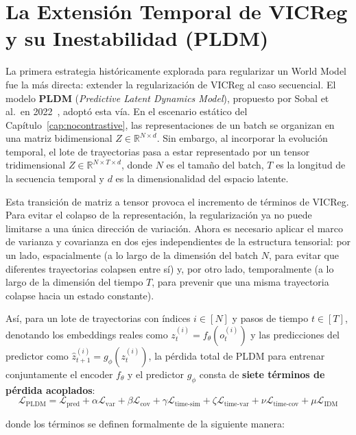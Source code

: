 \section{La Extensión Temporal de VICReg y su Inestabilidad (PLDM)}
\label{sec:vicreg_temporal_pldm}

La primera estrategia históricamente explorada para regularizar un World Model fue la más directa: extender la regularización de VICReg al caso secuencial. El modelo \textbf{PLDM} (\textit{Predictive Latent Dynamics Model}), propuesto por Sobal et al.\ en 2022~\cite{sobal2022joint}, adoptó esta vía. En el escenario estático del Capítulo~\ref{cap:nocontrastive}, las representaciones de un batch se organizan en una matriz bidimensional $Z \in \mathbb{R}^{N \times d}$. Sin embargo, al incorporar la evolución temporal, el lote de trayectorias pasa a estar representado por un tensor tridimensional $Z \in \mathbb{R}^{N \times T \times d}$, donde $N$ es el tamaño del batch, $T$ es la longitud de la secuencia temporal y $d$ es la dimensionalidad del espacio latente.

Esta transición de matriz a tensor provoca el incremento de términos de VICReg. Para evitar el colapso de la representación, la regularización ya no puede limitarse a una única dirección de variación. Ahora es necesario aplicar el marco de varianza y covarianza en dos ejes independientes de la estructura tensorial: por un lado, espacialmente (a lo largo de la dimensión del batch $N$, para evitar que diferentes trayectorias colapsen entre sí) y, por otro lado, temporalmente (a lo largo de la dimensión del tiempo $T$, para prevenir que una misma trayectoria colapse hacia un estado constante).

Así, para un lote de trayectorias con índices $i \in [N]$ y pasos de tiempo $t \in [T]$, denotando los embeddings reales como $z_t^{(i)} = f_{\theta}(o_t^{(i)})$ y las predicciones del predictor como $\hat{z}_{t+1}^{(i)} = g_{\phi}(z_t^{(i)})$, la pérdida total de PLDM para entrenar conjuntamente el encoder $f_{\theta}$ y el predictor $g_{\phi}$ consta de \textbf{siete términos de pérdida acoplados}:
\begin{equation}
\mathcal{L}_{\text{PLDM}} = \mathcal{L}_{\text{pred}} + \alpha \mathcal{L}_{\text{var}} + \beta \mathcal{L}_{\text{cov}} + \gamma \mathcal{L}_{\text{time-sim}} + \zeta \mathcal{L}_{\text{time-var}} + \nu \mathcal{L}_{\text{time-cov}} + \mu \mathcal{L}_{\text{IDM}}
\end{equation}

donde los términos se definen formalmente de la siguiente manera:

